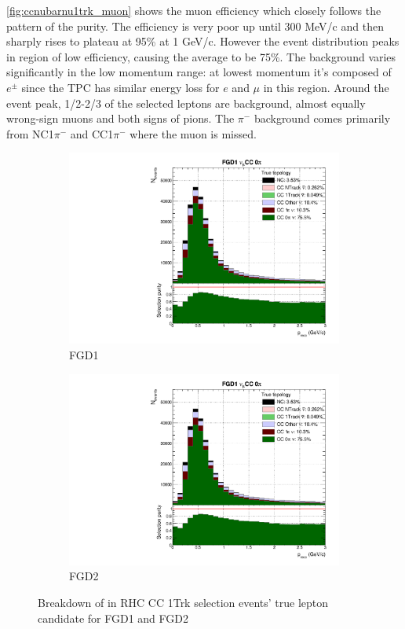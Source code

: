 \autoref{fig:ccnubarnu1trk_muon} shows the muon efficiency which closely follows the pattern of the purity. The efficiency is very poor up until 300 MeV/c and then sharply rises to plateau at 95\% at 1 GeV/c. However the event distribution peaks in region of low efficiency, causing the average to be 75\%. The background varies significantly in the low momentum range: at lowest momentum it's composed of $e^\pm$ since the TPC has similar energy loss for $e$ and $\mu$ in this region. Around the event peak, 1/2-2/3 of the selected leptons are background, almost equally wrong-sign muons and both signs of pions. The $\pi^-$ background comes primarily from NC1$\pi^-$ and \numubar CC1$\pi^-$ where the muon is missed.
\begin{figure}[!h]
	\begin{subfigure}[t]{0.49\textwidth}
		\includegraphics[width=\textwidth,page=22, trim={0mm 0mm 0mm 9mm}, clip]{figures/mach3/selection/2017b_Diag_WithSelection}
		\caption{FGD1}
	\end{subfigure}
	\begin{subfigure}[t]{0.49\textwidth}
		\includegraphics[width=\textwidth,page=26, trim={0mm 0mm 0mm 9mm}, clip]{figures/mach3/selection/2017b_Diag_WithSelection}
		\caption{FGD2}
	\end{subfigure}
	\caption{Breakdown of \numu in RHC CC 1Trk selection events' true lepton candidate for FGD1 and FGD2 }
	\label{fig:ccnubarnu1trk_muon}
\end{figure}

